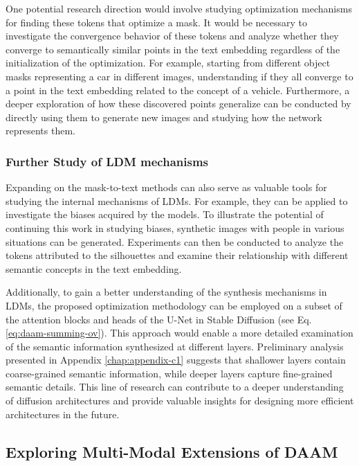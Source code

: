 One potential research direction would involve studying optimization mechanisms for finding these tokens that optimize a mask. It would be necessary to investigate the convergence behavior of these tokens and analyze whether they converge to semantically similar points in the text embedding regardless of the initialization of the optimization. For example, starting from different object masks representing a car in different images, understanding if they all converge to a point in the text embedding related to the concept of a vehicle. Furthermore, a deeper exploration of how these discovered points generalize can be conducted by directly using them to generate new images and studying how the network represents them.

\subsubsection{Further Study of LDM mechanisms}

Expanding on the mask-to-text methods can also serve as valuable tools for studying the internal mechanisms of LDMs. For example, they can be applied to investigate the biases acquired by the models. To illustrate the potential of continuing this work in studying biases, synthetic images with people in various situations can be generated. Experiments can then be conducted to analyze the tokens attributed to the silhouettes and examine their relationship with different semantic concepts in the text embedding.

Additionally, to gain a better understanding of the synthesis mechanisms in LDMs, the proposed optimization methodology can be employed on a subset of the attention blocks and heads of the U-Net in Stable Diffusion (see Eq. \ref{eq:daam-summing-ov}). This approach would enable a more detailed examination of the semantic information synthesized at different layers. Preliminary analysis presented in Appendix \ref{chap:appendix-c1} suggests that shallower layers contain coarse-grained semantic information, while deeper layers capture fine-grained semantic details. This line of research can contribute to a deeper understanding of diffusion architectures and provide valuable insights for designing more efficient architectures in the future.


\subsection{Exploring Multi-Modal Extensions of DAAM}
\label{sec:future-modalities}


